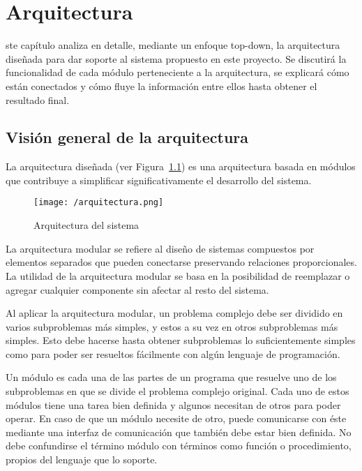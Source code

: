 \chapter{Arquitectura}
\label{chap:arquitectura}

ste capítulo analiza en detalle, mediante un enfoque top-down, la arquitectura diseñada para dar soporte al sistema propuesto en este proyecto. Se discutirá la funcionalidad de cada módulo perteneciente a la arquitectura, se explicará cómo están conectados y cómo fluye la información entre ellos hasta obtener el resultado final. 

\section{Visión general de la arquitectura}
\label{sec:visiongeneral}

La arquitectura diseñada (ver Figura~\ref{fig:arquitectura}) es una arquitectura basada en módulos que contribuye a simplificar significativamente el desarrollo del sistema. 

\begin{figure}[!h]
\begin{center}
\texttt{[image: /arquitectura.png]}
\caption[Arquitectura del sistema]{Arquitectura del sistema}
\label{fig:arquitectura}
\end{center}
\end{figure}

La arquitectura modular se refiere al diseño de sistemas compuestos por elementos separados que pueden conectarse preservando relaciones proporcionales. La utilidad de la arquitectura modular se basa en la posibilidad de reemplazar o agregar cualquier componente sin afectar al resto del sistema.

Al aplicar la arquitectura modular, un problema complejo debe ser dividido en varios subproblemas más simples, y estos a su vez en otros subproblemas más simples. Esto debe hacerse hasta obtener subproblemas lo suficientemente simples como para poder ser resueltos fácilmente con algún lenguaje de programación.

Un módulo es cada una de las partes de un programa que resuelve uno de los subproblemas en que se divide el problema complejo original. Cada uno de estos módulos tiene una tarea bien definida y algunos necesitan de otros para poder operar. En caso de que un módulo necesite de otro, puede comunicarse con éste mediante una interfaz de comunicación que también debe estar bien definida. No debe confundirse el término módulo con términos como función o procedimiento, propios del lenguaje que lo soporte.

